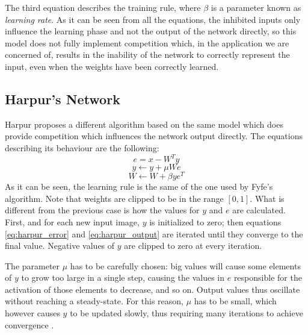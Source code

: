 \documentclass[11pt,a4paper]{report}
\begin{document}
				The third equation describes the training rule, where $\beta$ is a parameter known as \emph{learning rate}. As it can be seen from all the equations, the inhibited inputs only influence the learning phase and not the output of the network directly, so this model does not fully implement competition which, in the application we are concerned of, results in the inability of the network to correctly represent the input, even when the weights have been correctly learned.
				
			\subsection{Harpur's Network}
				Harpur proposes a different algorithm based on the same model \cite{harpur1994fast,harpur1996development,harpur1997low} which does provide competition which influences the network output directly. The equations describing its behaviour are the following:
				\begin{equation}
					\label{eq:harpur_error}
					e = x - W^Ty
				\end{equation}
				\begin{equation}
					\label{eq:harpur_output}
					y \leftarrow y + \mu W e
				\end{equation}
				\begin{equation}
					W \leftarrow W + \beta y e^T
				\end{equation}
				As it can be seen, the learning rule is the same of the one used by Fyfe's algorithm. Note that weights are clipped to be in the range $[0,1]$. What is different from the previous case is how the values for $y$ and $e$ are calculated. First, and for each new input image, $y$ is initialized to zero; then equations \ref{eq:harpur_error} and \ref{eq:harpur_output} are iterated until they converge to the final value. Negative values of $y$ are clipped to zero at every iteration.
				
				The parameter $\mu$ has to be carefully chosen: big values will cause some elements of $y$ to grow too large in a single step, causing the values in $e$ responsible for the activation of those elements to decrease, and so on. Output values thus oscillate without reaching a steady-state. For this reason, $\mu$ has to be small, which however causes $y$ to be updated slowly, thus requiring many iterations to achieve convergence \cite{spratling2009unsupervised}.
	
\end{document}
